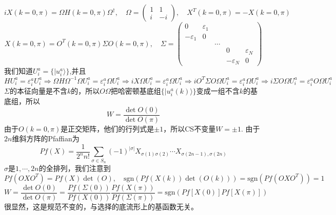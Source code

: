 \documentclass[a4paper]{article}
\numberwithin{equation}{subsection}
\begin{document}
\begin{equation}
    iX(k=0,\pi)=\Omega H(k=0,\pi)\Omega^\dagger,\quad\Omega=\begin{pmatrix}
        1&1\\
        i&-i
    \end{pmatrix},\quad X^T(k=0,\pi)=-X(k=0,\pi)
\end{equation}
\begin{equation}
    X(k=0,\pi)=O^T(k=0,\pi)\Sigma O(k=0,\pi),\quad\Sigma=\begin{pmatrix}
        0&\varepsilon_1\\
        -\varepsilon_1&0\\
        &&\ldots\\
        &&&0&\varepsilon_N\\
        &&&-\varepsilon_N&0
    \end{pmatrix}
\end{equation}
我们知道$U_i^a=\{|u_i^a\rangle\}$,并且
\begin{equation}
    HU_i^a=\varepsilon_i^a U_i^a\Rightarrow\Omega H\Omega^{-1}\Omega U_i^a=\varepsilon_i^a\Omega U_i^a\Rightarrow iX\Omega U_i^a=\varepsilon_i^a\Omega U_i^a\Rightarrow iO^T\Sigma O\Omega U_i^a=\varepsilon_i^a\Omega U_i^a\Rightarrow i\Sigma O\Omega U_i^a=\varepsilon_i^aO\Omega U_i^a
\end{equation}
$\Sigma$的本征向量是不含$k$的，所以$O\Omega$把哈密顿基底组$\{|u_i^a(k)\rangle\}$变成一组不含$k$的基底组，所以
\begin{equation}
    W=\frac{\det O(0)}{\det O(\pi)}
\end{equation}
由于$O(k=0,\pi)$是正交矩阵，他们的行列式是$\pm 1$，所以CS不变量$W=\pm 1$. 由于$2n$维斜方阵的Pfaffian为
\begin{equation}
    Pf(X)=\frac{1}{2^n n!}\sum_{\sigma\in S_n}(-1)^{|\sigma|}X_{\sigma(1)\sigma(2)}\cdots X_{\sigma(2n-1),\sigma(2n)}
\end{equation}
$\sigma$是$1,\cdots,2n$的全排列，我们注意到
\begin{equation}
    Pf(OXO^T)=Pf(X)\det(O),\quad\mathrm{sgn}(Pf(X(k))\det(O(k)))=\mathrm{sgn}(Pf(OXO^T))=1
\end{equation}
\begin{equation}
    W=\frac{\det O(0)}{\det O(\pi)}=\frac{Pf(\Sigma(0))}{Pf(X(0))}\frac{Pf(X(\pi))}{Pf(\Sigma(\pi))}=\mathrm{sgn}(Pf[X(0)]Pf[X(\pi)])
\end{equation}
很显然，这是规范不变的，与选择的底流形上的基函数无关。
\end{document}
